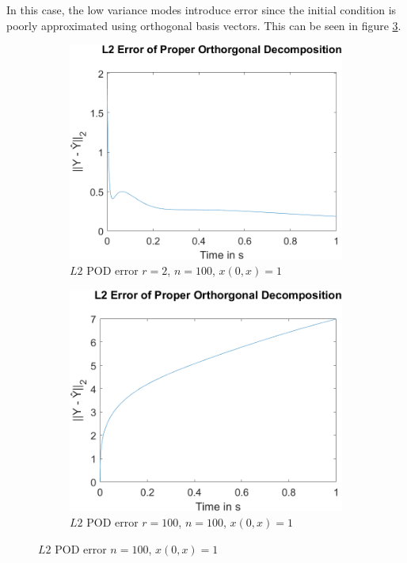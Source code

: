 In this case, the low variance modes introduce error since the initial condition is poorly approximated using orthogonal basis vectors.
This can be seen in figure \ref{fig-pod-100}.
\begin{figure}[H]
\begin{subfigure}[b]{0.5\textwidth}
\centering
\includegraphics[width=\textwidth]{images/L2_Proper Orthorgonal Decomposition_2_100}
\caption{$L2$ POD error $r=2$, $n=100$, $x(0, x) = 1$}
\label{fig:fig-pod-2-100}
\end{subfigure}
\begin{subfigure}[b]{0.5\textwidth}
\centering
\includegraphics[width=\textwidth]{images/L2_Proper Orthorgonal Decomposition_100_100}
\caption{$L2$ POD error $r=100$, $n=100$, $x(0, x) = 1$}
\label{fig:fig-pod-100-100}
\end{subfigure}
\caption{$L2$ POD error $n=100$, $x(0, x) = 1$}
\label{fig-pod-100}
\end{figure}

